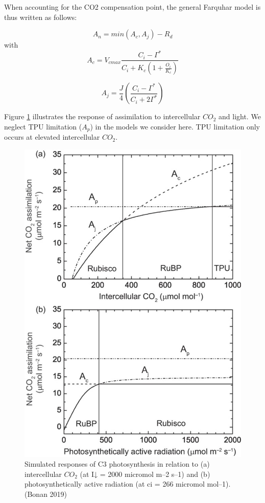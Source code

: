 \documentclass[
  12pt,
  oneside]{book}
\begin{document}
When accounting for the CO2 compensation point, the general Farquhar model is thus written as follows:

\[
A_n=min(A_c,A_j)-R_d
\]
with
\[
A_c = V_{cmax}\frac{C_i-\Gamma^*}{C_i+K_c\left(1+\frac{O_i}{K_c}\right)}
\]

\[
A_j = \frac{J}{4}\left(\frac{C_i-\Gamma^*}{C_i+2\Gamma^*}\right)
\]

Figure \ref{fig:f28} illustrates the response of assimilation to intercellular \(CO_2\) and light. We neglect TPU limitation (\(A_p\)) in the models we consider here. TPU limitation only occurs at elevated intercellular \(CO_2\).

\begin{figure}

{\centering \includegraphics[width=0.8\linewidth]{figures/chap2/simulated_responses} 

}

\caption{Simulated responses of C3 photosynthesis in relation to (a) intercellular $CO_2$ (at I↓ = 2000 micromol m–2 s–1) and (b) photosynthetically active radiation (at ci = 266 micromol mol–1). (Bonan 2019)}\label{fig:f28}
\end{figure}
\end{document}
